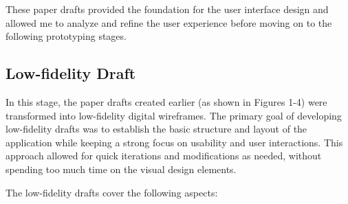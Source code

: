These paper drafts provided the foundation for the user interface design and allowed me to analyze and refine the user experience before moving on to the following prototyping stages.

\subsection{Low-fidelity Draft}
In this stage, the paper drafts created earlier (as shown in Figures 1-4) were transformed into low-fidelity digital wireframes. The primary goal of developing low-fidelity drafts was to establish the basic structure and layout of the application while keeping a strong focus on usability and user interactions. This approach allowed for quick iterations and modifications as needed, without spending too much time on the visual design elements.

The low-fidelity drafts cover the following aspects:

